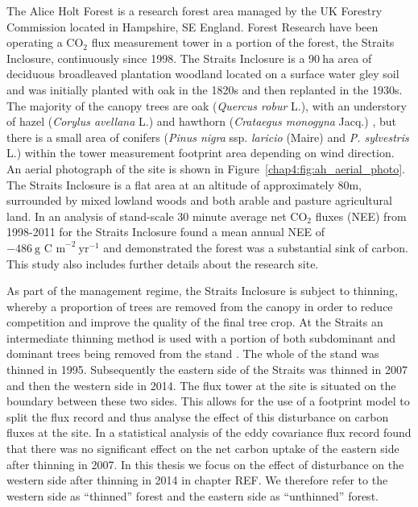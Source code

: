 The Alice Holt Forest is a research forest area managed by the UK Forestry Commission located in Hampshire, SE England. Forest Research have been operating a $\text{CO}_{2}$ flux measurement tower in a portion of the forest, the Straits Inclosure, continuously since 1998. The Straits Inclosure is a $90~\text{ha}$ area of deciduous broadleaved plantation woodland located on a surface water gley soil and was initially planted with oak in the 1820s \citep{schlich1905working} and then replanted in the 1930s. The majority of the canopy trees are oak (\textit{Quercus robur} L.), with an understory of hazel (\textit{Corylus avellana} L.) and hawthorn (\textit{Crataegus monogyna} Jacq.) \citep{pitman2001leaf}, but there is a small area of conifers (\textit{Pinus nigra} ssp. \textit{laricio} (Maire) and \textit{P. sylvestris} L.) within the tower measurement footprint area depending on wind direction. An aerial photograph of the site is shown in Figure~\ref{chap4:fig:ah_aerial_photo}. The Straits Inclosure is a flat area at an altitude of approximately 80m, surrounded by mixed lowland woods and both arable and pasture agricultural land. In \citet{wilkinson2012inter} an analysis of stand-scale $30$ minute average net $\text{CO}_{2}$ fluxes (NEE) from 1998-2011 for the Straits Inclosure found a mean annual NEE of \(-486~\text{g C m}^{-2}~\text{yr}^{-1}\) and demonstrated the forest was a substantial sink of carbon. This study also includes further details about the research site. 

As part of the management regime, the Straits Inclosure is subject to thinning, whereby a proportion of trees are removed from the canopy in order to reduce competition and improve the quality of the final tree crop. At the Straits an intermediate thinning method is used with a portion of both subdominant and dominant trees being removed from the stand \citep{kerr2011thinning}. The whole of the stand was thinned in 1995. Subsequently the eastern side of the Straits was thinned in 2007 and then the western side in 2014. The flux tower at the site is situated on the boundary between these two sides. This allows for the use of a footprint model to split the flux record and thus analyse the effect of this disturbance on carbon fluxes at the site. In \citet{wilkinson2015effects} a statistical analysis of the eddy covariance flux record found that there was no significant effect on the net carbon uptake of the eastern side after thinning in 2007. In this thesis we focus on the effect of disturbance on the western side after thinning in 2014 in chapter REF. We therefore refer to the western side as ``thinned'' forest and the eastern side as ``unthinned'' forest.   


